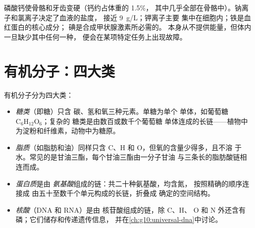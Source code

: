 \begin{example}[常见的无机盐]\label{ex:g10:chemistry-of-life:salts}
磷酸钙使骨骼和牙齿变硬（钙约占体重的 1.5\%，
其中几乎全部在骨骼中）。钠离子和氯离子决定了血液的盐度，
接近 \qty{9}{g/L}；钾离子主要
集中在细胞内；铁是血红蛋白的核心成分；
碘是合成甲状腺激素所必需的。
本身从不提供能量，但体内一旦缺少其中任何一种，
便会在某项特定任务上出现故障。
\end{example}

\section{有机分子：四大类}

\begin{definition}[糖类、脂质、蛋白质、核酸]\label{def:g10:chemistry-of-life:families}
有机分子分为四大类：
\begin{itemize}
  \item \emph{糖类}（即糖）只含
        碳、氢和氧三种元素。单糖为单个
        单体，如葡萄糖 $\mathrm{C_6H_{12}O_6}$；复杂的
        糖类是由数百或数千个葡萄糖
        单体连成的长链——植物中为淀粉和纤维素，动物中为糖原。
  \item \emph{脂质}（如脂肪和油）同样只含
        C、H 和 O，但氧的含量少得多，且不溶
        于水。常见的是甘油三酯，每个甘油三酯由一分子甘油
        与三条长的脂肪酸链相连而成。
  \item \emph{蛋白质}是由
        \emph{氨基酸}组成的链：共二十种氨基酸，均含氮，
        按照精确的顺序连接成
        由五十至数千个单元构成的长链，折叠成
        确定的空间结构。
  \item \emph{核酸}（DNA 和 RNA）是由
        核苷酸组成的链，除 C、H、
        O 和 N 外还含有磷；它们储存和传递遗传信息，
        并在\cref{ch:g10:universal-dna}中讨论。
\end{itemize}
\end{definition}

